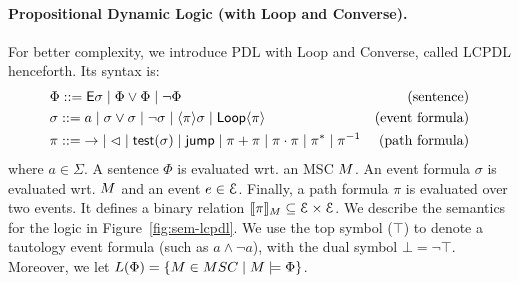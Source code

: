 \documentclass[a4paper,UKenglish,cleveref, autoref, thm-restate]{lipics-v2021}
\begin{document}
\paragraph*{Propositional Dynamic Logic (with Loop and Converse).}

For better complexity, we introduce PDL with Loop and Converse, called LCPDL henceforth.
Its syntax is:
\begin{align*}
	&\Phi ::=  \textsf{E} \sigma \mid \Phi \vee \Phi \mid \neg \Phi &\text{(sentence)} \\
	&\sigma ::= a \mid \sigma \vee \sigma \mid \neg \sigma \mid \langle \pi \rangle \sigma \mid \textsf{Loop}\langle \pi \rangle &\text{(event formula)} \\
	&\pi ::= {\to} \mid {\lhd} \mid \textsf{test}(\sigma) \mid \textsf{jump} \mid \pi + \pi \mid \pi \cdot \pi \mid \pi^* \mid \pi^{-1} &\text{(path formula)}
\end{align*}
where $a \in \Sigma$. A sentence $\Phi$ is evaluated wrt. an MSC $M$. An event formula $\sigma$ is
evaluated wrt. $M$ and an event $e \in \mathcal{E}$. Finally, a path formula $\pi$ is evaluated over two events. It defines a binary relation $\llbracket \pi \rrbracket _M \subseteq \mathcal{E} \times \mathcal{E}$.
We describe the semantics for the logic in Figure~\ref{fig:sem-lcpdl}. We use the top symbol ($\top $) to denote a tautology event formula (such as $a \wedge \neg a$), with the dual symbol $\bot = \neg \top$.
Moreover, we let $L(\Phi) = \{\msc \in \MSCs \mid \msc \models \Phi\}$.
\end{document}
